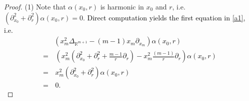 \documentclass[10pt,a4paper]{amsart}
\begin{document}
\begin{proof} %

(1) Note that $\alpha(x_{0}, r)$ is harmonic in $x_{0}$ and $r$, i.e.  $(\partial^{2}_{x_{0}}+\partial_{r}^{2})\alpha(x_{0}, r)=0$. \textcolor{black}{Direct computation yields
the first equation in \eqref{a1}, i.e.
\begin{equation*}
\begin{split}
     &\left(x_{m}^{2}\Delta_{\mathbb{R}^{m+1}} -(m-1)x_{m} \partial_{x_{m}}\right)\alpha(x_{0}, r)\\
     = & \,\left(x_{m}^{2} \left(\partial_{x_{0}}^{2}+\partial_{r}^{2}+\frac{m-1}{r}\partial_{r}\right)-x_{m}^{2} \frac{(m-1)}{r}\partial_{r} \right)\alpha(x_{0}, r) \\
     = & \, x_{m}^{2}\left(\partial^{2}_{x_{0}}+\partial_{r}^{2}\right)\alpha(x_{0}, r)\\
     = & \, 0.
\end{split}
\end{equation*}}


\end{proof}
\end{document}

